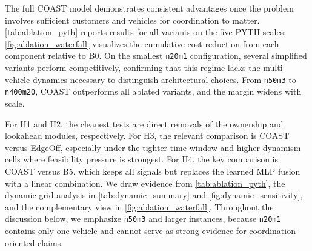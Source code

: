 \documentclass[conference]{IEEEtran}
\begin{document}
The full COAST model demonstrates consistent advantages once the problem involves sufficient customers and vehicles for coordination to matter. \autoref{tab:ablation_pyth} reports results for all variants on the five PYTH scales; \autoref{fig:ablation_waterfall} visualizes the cumulative cost reduction from each component relative to B0. On the smallest \texttt{n20m1} configuration, several simplified variants perform competitively, confirming that this regime lacks the multi-vehicle dynamics necessary to distinguish architectural choices. From \texttt{n50m3} to \texttt{n400m20}, COAST outperforms all ablated variants, and the margin widens with scale.

\begin{table}[t]
\centering
\caption{Ablation results on PYTH datasets. Values are mean normalized cost $\pm$ standard deviation.}
\label{tab:ablation_pyth}
\scriptsize
{}
\end{table}

For H1 and H2, the cleanest tests are direct removals of the ownership and lookahead modules, respectively. For H3, the relevant comparison is COAST versus EdgeOff, especially under the tighter time-window and higher-dynamism cells where feasibility pressure is strongest. For H4, the key comparison is COAST versus B5, which keeps all signals but replaces the learned MLP fusion with a linear combination. We draw evidence from \autoref{tab:ablation_pyth}, the dynamic-grid analysis in \autoref{tab:dynamic_summary} and \autoref{fig:dynamic_sensitivity}, and the complementary view in \autoref{fig:ablation_waterfall}. Throughout the discussion below, we emphasize \texttt{n50m3} and larger instances, because \texttt{n20m1} contains only one vehicle and cannot serve as strong evidence for coordination-oriented claims.
\end{document}

